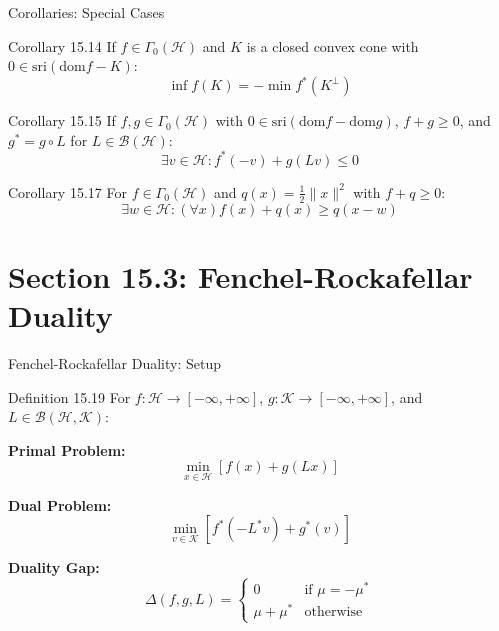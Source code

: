\documentclass[aspectratio=169,10pt]{beamer}
\begin{document}
\begin{frame}{Corollaries: Special Cases}
  \begin{block}{Corollary 15.14}
    If $f \in \Gamma_0(\mathcal{H})$ and $K$ is a closed convex cone with $0 \in \text{sri}(\text{dom} f - K)$:
    \[
      \inf f(K) = -\min f^*(K^\perp)
    \]
  \end{block}
  
  \begin{block}{Corollary 15.15}
    If $f, g \in \Gamma_0(\mathcal{H})$ with $0 \in \text{sri}(\text{dom} f - \text{dom} g)$, $f+g \geq 0$, and $g^* = g \circ L$ for $L \in \mathcal{B}(\mathcal{H})$:
    \[
      \exists v \in \mathcal{H}: f^*(-v) + g(Lv) \leq 0
    \]
  \end{block}
  
  \begin{block}{Corollary 15.17}
    For $f \in \Gamma_0(\mathcal{H})$ and $q(x) = \frac{1}{2}\|x\|^2$ with $f + q \geq 0$:
    \[
      \exists w \in \mathcal{H}: (\forall x) f(x) + q(x) \geq q(x-w)
    \]
  \end{block}
\end{frame}


\section[15.3]{Section 15.3: Fenchel-Rockafellar Duality}

\begin{frame}{Fenchel-Rockafellar Duality: Setup}
  \begin{block}{Definition 15.19}
    For $f: \mathcal{H} \to [-\infty, +\infty]$, $g: \mathcal{K} \to [-\infty, +\infty]$, and $L \in \mathcal{B}(\mathcal{H}, \mathcal{K})$:
    
    \textbf{Primal Problem:}
    \[
      \min_{x \in \mathcal{H}} [f(x) + g(Lx)]
    \]
    
    \textbf{Dual Problem:}
    \[
      \min_{v \in \mathcal{K}} [f^*(-L^*v) + g^*(v)]
    \]
    
    \textbf{Duality Gap:}
    \[
      \Delta(f,g,L) = \begin{cases}
        0 & \text{if } \mu = -\mu^* \\
        \mu + \mu^* & \text{otherwise}
      \end{cases}
    \]
  \end{block}
\end{frame}
\end{document}
